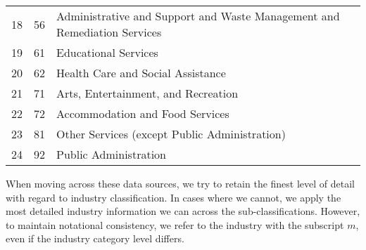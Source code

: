 \documentclass[article,11pt,letterpaper,fleqn]{article}
\theoremstyle{definition}
\numberwithin{equation}{section}
\begin{document}
\begin{table}[htbp]
\begin{tabular}{lll}
    18    & 56    & Administrative and Support and Waste Management and Remediation Services \\
    19    & 61    & Educational Services \\
    20    & 62    & Health Care and Social Assistance \\
    21    & 71    & Arts, Entertainment, and Recreation \\
    22    & 72    & Accommodation and Food Services \\
    23    & 81    & Other Services (except Public Administration) \\
    24    & 92    & Public Administration \\
      \hline
    \hline
    \end{tabular}%
  \label{tab:prod_ind}%
\end{table}%

When moving across these data sources, we try to retain the finest level of detail with regard to industry classification.  In cases where we cannot, we apply the most detailed industry information we can across the sub-classifications.  However, to maintain notational consistency, we refer to the industry with the subscript $m$, even if the industry category level differs.



\end{document}
